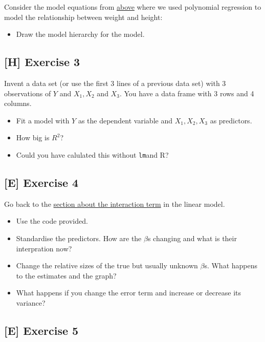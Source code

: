 \documentclass[
]{book}
\providecommand{\tightlist}{%
  \setlength{\itemsep}{0pt}\setlength{\parskip}{0pt}}
\begin{document}
Consider the model equations from \hyperref[adding_transformed_predictor_bayes]{above}
where we used polynomial regression to model the relationship between
weight and height:

\begin{itemize}
\tightlist
\item
  Draw the model hierarchy for the model.
\end{itemize}

\subsection{{[}H{]} Exercise 3}\label{exercise3_multiple_regression}

Invent a data set (or use the first 3 lines of a previous data set)
with 3 observations of \(Y\) and \(X_1, X_2\) and \(X_3\). You have a data frame
with 3 rows and 4 columns.

\begin{itemize}
\tightlist
\item
  Fit a model with \(Y\) as the dependent variable and \(X_1, X_2, X_3\) as predictors.
\item
  How big is \(R^2\)?
\item
  Could you have calulated this without \texttt{lm}and R?
\end{itemize}

\subsection{{[}E{]} Exercise 4}\label{exercise4_multiple_regression}

Go back to the \hyperref[interaction_term]{section about the interaction term} in the linear model.

\begin{itemize}
\tightlist
\item
  Use the code provided.
\item
  Standardise the predictors. How are the \(\beta\)s changing and what is their interpration now?
\item
  Change the relative sizes of the true but usually unknown \(\beta\)s.
  What happens to the estimates and the graph?
\item
  What happens if you change the error term and increase or decrease its variance?
\end{itemize}

\subsection{{[}E{]} Exercise 5}\label{exercise5_multiple_regression}
\end{document}
